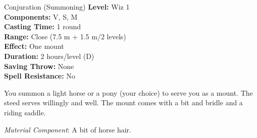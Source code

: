 {Conjuration (Summoning)}
{
	\textbf{Level:}
	Wiz 1\\
	\textbf{Components:}
	V, S, M\\
	\textbf{Casting Time:}
	1 round\\
	\textbf{Range:}
	Close (7.5 m + 1.5 m/2 levels)\\
	\textbf{Effect:}
	One mount\\
	\textbf{Duration:}
	2 hours/level (D)\\
	\textbf{Saving Throw:}
	None\\
	\textbf{Spell Resistance:}
	No\\
}
{
	You summon a light horse or a pony (your choice) to serve you as a mount. The steed serves willingly and well. The mount comes with a bit and bridle and a riding saddle.

	\textit{Material Component}:
	A bit of horse hair.

}
